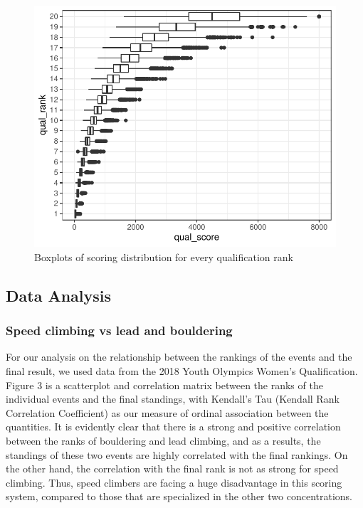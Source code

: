 \documentclass[12pt]{article}
\begin{document}
\begin{figure}[H]
\centering
\includegraphics{draft_files/figure-latex/unnamed-chunk-8-1.pdf}
\caption{Boxplots of scoring distribution for every qualification rank}
\end{figure}

\hypertarget{data-analysis}{%
\subsection{Data Analysis}\label{data-analysis}}

\hypertarget{speed-climbing-vs-lead-and-bouldering}{%
\subsubsection{Speed climbing vs lead and
bouldering}\label{speed-climbing-vs-lead-and-bouldering}}

For our analysis on the relationship between the rankings of the events
and the final result, we used data from the 2018 Youth Olympics Women's
Qualification. Figure 3 is a scatterplot and correlation matrix between
the ranks of the individual events and the final standings, with
Kendall's Tau (Kendall Rank Correlation Coefficient) as our measure of
ordinal association between the quantities. It is evidently clear that
there is a strong and positive correlation between the ranks of
bouldering and lead climbing, and as a results, the standings of these
two events are highly correlated with the final rankings. On the other
hand, the correlation with the final rank is not as strong for speed
climbing. Thus, speed climbers are facing a huge disadvantage in this
scoring system, compared to those that are specialized in the other two
concentrations.
\end{document}

